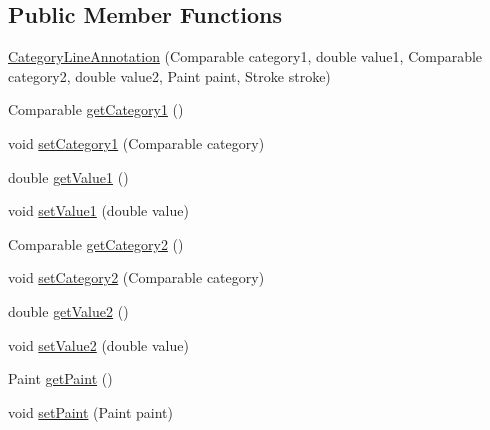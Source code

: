 \subsection*{Public Member Functions}
\begin{DoxyCompactItemize}
\item 
\mbox{\hyperlink{classorg_1_1jfree_1_1chart_1_1annotations_1_1_category_line_annotation_a9d6d73b827e70bed39f54fd25c72bd6c}{Category\+Line\+Annotation}} (Comparable category1, double value1, Comparable category2, double value2, Paint paint, Stroke stroke)
\item 
Comparable \mbox{\hyperlink{classorg_1_1jfree_1_1chart_1_1annotations_1_1_category_line_annotation_a56d50318c866e40566dacf0d2f0e9ef2}{get\+Category1}} ()
\item 
void \mbox{\hyperlink{classorg_1_1jfree_1_1chart_1_1annotations_1_1_category_line_annotation_a938e3f8962167a40fa217f1c9ede6bee}{set\+Category1}} (Comparable category)
\item 
double \mbox{\hyperlink{classorg_1_1jfree_1_1chart_1_1annotations_1_1_category_line_annotation_a5237dccaaf690f7352535377216b04f5}{get\+Value1}} ()
\item 
void \mbox{\hyperlink{classorg_1_1jfree_1_1chart_1_1annotations_1_1_category_line_annotation_a781fe86987bd6b0b714f52385eeea200}{set\+Value1}} (double value)
\item 
Comparable \mbox{\hyperlink{classorg_1_1jfree_1_1chart_1_1annotations_1_1_category_line_annotation_a66690ee750cd82f99ccf3358fe57007b}{get\+Category2}} ()
\item 
void \mbox{\hyperlink{classorg_1_1jfree_1_1chart_1_1annotations_1_1_category_line_annotation_a49f3bccd488d3de9cd343be3057d6da9}{set\+Category2}} (Comparable category)
\item 
double \mbox{\hyperlink{classorg_1_1jfree_1_1chart_1_1annotations_1_1_category_line_annotation_ad87150da9363210985e430ad0c1135e2}{get\+Value2}} ()
\item 
void \mbox{\hyperlink{classorg_1_1jfree_1_1chart_1_1annotations_1_1_category_line_annotation_a5857a0ef19b2eed096cd086cbcb972d6}{set\+Value2}} (double value)
\item 
Paint \mbox{\hyperlink{classorg_1_1jfree_1_1chart_1_1annotations_1_1_category_line_annotation_a47cb5c29bbf096219ba83972083ca987}{get\+Paint}} ()
\item 
void \mbox{\hyperlink{classorg_1_1jfree_1_1chart_1_1annotations_1_1_category_line_annotation_a52c504b2c4291d9d6749f1d6460fbfec}{set\+Paint}} (Paint paint)
\item 

\end{DoxyCompactItemize}
